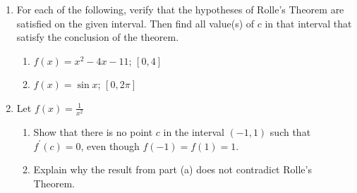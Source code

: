 \documentclass[12pt]{article}
\newif\ifans
\begin{document}
\begin{enumerate}

\item For each of the following, verify that the hypotheses of Rolle's Theorem are satisfied on the given interval. Then find all value(s) of $c$ in that interval that satisfy the conclusion of the theorem.

\begin{enumerate}

\item $f(x)=x^2-4x-11$; $[0,4]$

\ifans{\fbox{\parbox{1\linewidth}{$f(x)$ is a polynomial; so, it is continuous and differentiable everywhere on $(-\infty,\infty)$.  In particular, it is continuous on $[0,4]$ and differentiable on $(0,4)$.  Finally, notice that $f(0)=f(4)=-11$.  Thus, all of the hypotheses of Rolle's Theorem are satisfied and there exists a $c$ in $(0,4)$ with $f^{\prime}(c)=0$.  In particular, $c=2$.}}} \fi

\item $f(x)=\sin{x}$; $[0,2\pi]$

\ifans{\fbox{\parbox{1\linewidth}{$f(x)$ is continuous and differentiable everywhere on $(-\infty,\infty)$.  In particular, it is continuous on $[0,2\pi]$ and differentiable on $(0,2\pi)$.  Finally, notice that $f(0)=f(2\pi)=0$.  Thus, all of the hypotheses of Rolle's Theorem are satisfied and there exists a $c$ in $(0,2\pi)$ with $f^{\prime}(c)=0$.  In particular, $c$ is either $\frac{\pi}{2}$ or $\frac{3\pi}{2}$.}}}\fi

\end{enumerate}

\item Let $f(x)=\frac{1}{x^2}$

\begin{enumerate}

\item Show that there is no point $c$ in the interval $(-1,1)$ such that $f^{\prime}(c)=0$, even though $f(-1)=f(1)=1$.

\ifans{\fbox{\parbox{1\linewidth}{$f^{\prime}(x)=-\frac{2}{x^3}$ which is never 0.  Thus, there does not exist a $c$ in $(-1,1)$ with $f^{\prime}(c)=0$.}}}\fi

\item Explain why the result from part (a) does not contradict Rolle's Theorem.

\ifans{\fbox{\parbox{1\linewidth}{$f(x)$ is not continuous at $x=0$ which is in $[-1,1]$, so Rolle's Theorem doesn't apply.}} }\fi


\end{enumerate}
\end{enumerate}
\end{document}
